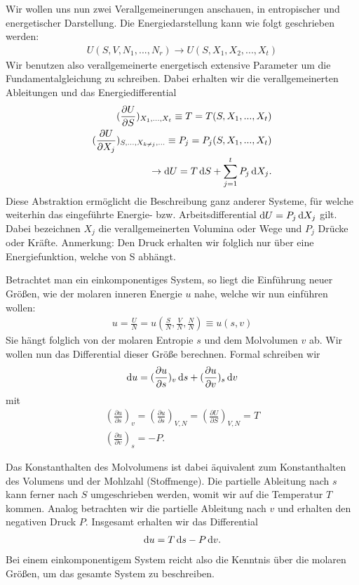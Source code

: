 Wir wollen uns nun zwei Verallgemeinerungen anschauen, in entropischer und energetischer Darstellung.
Die Energiedarstellung kann wie folgt geschrieben werden:
\begin{align}
    U(S,V,N_1,...,N_r) \rightarrow U(S,X_1,X_2,...,X_t)
\end{align} 
Wir benutzen also verallgemeinerte energetisch extensive Parameter um die Fundamentalgleichung zu schreiben. Dabei erhalten wir die verallgemeinerten Ableitungen und das Energiedifferential
\begin{align}
    (\frac{\partial U}{\partial S})_{X_1,...,X_t} \equiv T = T(S,X_1,...,X_t)\\
    (\frac{\partial U}{\partial X_j})_{S,...,X_{k\neq j},...} \equiv P_j = P_j(S,X_1,...,X_t)\\
    \rightarrow \mathop{}\!\mathrm{d} U = T\mathop{}\!\mathrm{d} S + \sum_{j=1}^tP_j\mathop{}\!\mathrm{d} X_j.
\end{align}
Diese Abstraktion ermöglicht die Beschreibung ganz anderer Systeme, für welche weiterhin das eingeführte Energie- bzw. Arbeitsdifferential $\mathop{}\!\mathrm{d} U = P_j\mathop{}\!\mathrm{d} X_j$ gilt.
Dabei bezeichnen $X_j$ die verallgemeinerten Volumina oder Wege und $P_j$ Drücke oder Kräfte.
Anmerkung: Den Druck erhalten wir folglich nur über eine Energiefunktion, welche von S abhängt.

Betrachtet man ein einkomponentiges System, so liegt die Einführung neuer Größen, wie der molaren inneren Energie $u$ nahe, welche wir nun einführen wollen:
\begin{align}
    u=\frac{U}{N}=u(\frac{S}{N},\frac{V}{N},\frac{N}{N})\equiv u(s,v)
\end{align}
Sie hängt folglich von der molaren Entropie $s$ und dem Molvolumen $v$ ab.
Wir wollen nun das Differential dieser Größe berechnen. Formal schreiben wir
\begin{align}
    \mathop{}\!\mathrm{d} u = (\frac{\partial u}{\partial s})_v \mathop{}\!\mathrm{d} s + (\frac{\partial u}{\partial v})_s\mathop{}\!\mathrm{d} v
\end{align}
mit
\begin{align}
    (\frac{\partial u}{\partial s})_v=(\frac{\partial u}{\partial s})_{V,N}=(\frac{\partial U}{\partial S})_{V,N}=T\\
    (\frac{\partial u}{\partial v})_s = -P.
\end{align}

Das Konstanthalten des Molvolumens ist dabei äquivalent zum Konstanthalten des Volumens und der Mohlzahl (Stoffmenge). Die partielle Ableitung nach $s$ kann ferner nach $S$ umgeschrieben werden, womit wir auf die Temperatur $T$ kommen.
Analog betrachten wir die partielle Ableitung nach $v$ und erhalten den negativen Druck $P$.
Insgesamt erhalten wir das Differential
\begin{align}
    \mathop{}\!\mathrm{d} u = T\mathop{}\!\mathrm{d} s -P\mathop{}\!\mathrm{d} v.
\end{align}
Bei einem einkomponentigem System reicht also die Kenntnis über die molaren Größen, um das gesamte System zu beschreiben.

